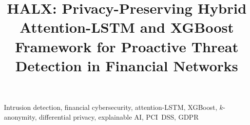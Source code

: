 \documentclass[conference]{IEEEtran}
\begin{document}
\title{HALX: Privacy-Preserving Hybrid Attention-LSTM and XGBoost
Framework for Proactive Threat Detection in Financial Networks}

\author{
\and
{}
}

\maketitle



\begin{IEEEkeywords}
Intrusion detection, financial cybersecurity, attention-LSTM, XGBoost,
$k$-anonymity, differential privacy, explainable AI, PCI~DSS, GDPR
\end{IEEEkeywords}









\end{document}
